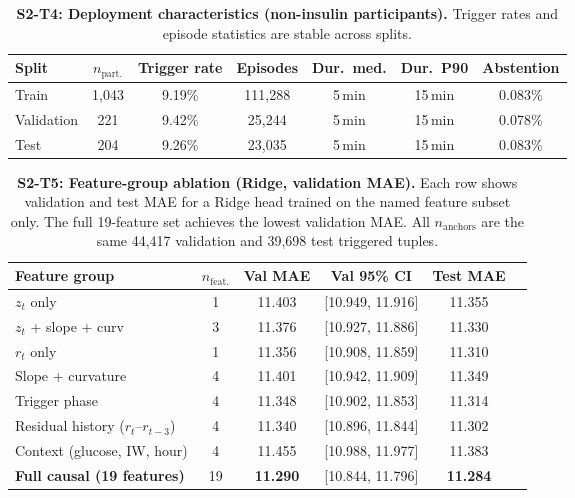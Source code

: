 \begin{table}[H]
  \centering
  \caption{%
    \textbf{S2-T4: Deployment characteristics (non-insulin participants).}
    Trigger rates and episode statistics are stable across splits.%
  }
  \label{tab:study2_deploy}
  \small
  \begin{tabular}{lcccccc}
    \toprule
    Split & $n_{\text{part.}}$ & Trigger rate & Episodes
      & Dur.\ med. & Dur.\ P90 & Abstention \\
    \midrule
    Train      & 1{,}043 & 9.19\% & 111{,}288 & 5\,min & 15\,min & 0.083\% \\
    Validation &   221   & 9.42\% &  25{,}244 & 5\,min & 15\,min & 0.078\% \\
    Test       &   204   & 9.26\% &  23{,}035 & 5\,min & 15\,min & 0.083\% \\
    \bottomrule
  \end{tabular}
\end{table}

\begin{table}[H]
  \centering
  \caption{%
    \textbf{S2-T5: Feature-group ablation (Ridge, validation MAE).}
    Each row shows validation and test MAE for a Ridge head
    trained on the named feature subset only.
    The full 19-feature set achieves the lowest validation MAE.
    All $n_{\text{anchors}}$ are the same 44{,}417 validation and
    39{,}698 test triggered tuples.%
  }
  \label{tab:study2_ablation}
  \small
  \begin{tabular}{lccccc}
    \toprule
    Feature group & $n_{\text{feat.}}$ & Val MAE & Val 95\% CI & Test MAE \\
    \midrule
    $z_t$ only                         & 1  & 11.403 & [10.949, 11.916] & 11.355 \\
    $z_t$ + slope + curv               & 3  & 11.376 & [10.927, 11.886] & 11.330 \\
    $r_t$ only                         & 1  & 11.356 & [10.908, 11.859] & 11.310 \\
    Slope + curvature                  & 4  & 11.401 & [10.942, 11.909] & 11.349 \\
    Trigger phase                      & 4  & 11.348 & [10.902, 11.853] & 11.314 \\
    Residual history ($r_t$--$r_{t-3}$)& 4  & 11.340 & [10.896, 11.844] & 11.302 \\
    Context (glucose, IW, hour)        & 4  & 11.455 & [10.988, 11.977] & 11.383 \\
    \textbf{Full causal (19 features)} & 19 & \textbf{11.290} & [10.844, 11.796] & \textbf{11.284} \\
    \bottomrule
  \end{tabular}
\end{table}
